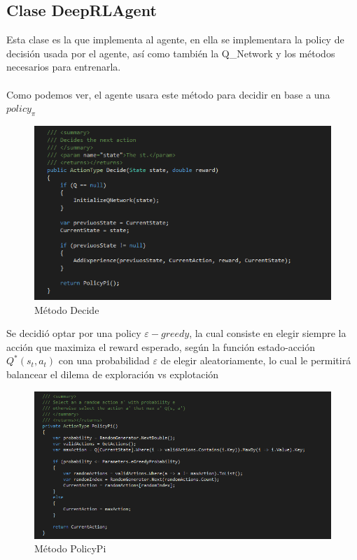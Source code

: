 \clearpage
\subsection{Clase DeepRLAgent}

Esta clase es la que implementa al agente, en ella se implementara la policy de decisión usada por el agente, así como también la Q\_Network y los métodos necesarios para entrenarla.
\\\\
Como podemos ver, el agente usara este método para decidir en base a una $policy_\pi$
\begin{figure}[h!]
	\centering
	\includegraphics[scale=0.6]{imagenes/screen6.png}
	\caption{Método Decide}
\end{figure}

Se decidió optar por una policy $\varepsilon-greedy$, la cual consiste en elegir siempre la acción que maximiza el reward esperado, según la función estado-acción $Q^*(s_t, a_t)$ con una probabilidad $\varepsilon$ de elegir aleatoriamente, lo cual le permitirá balancear el dilema de exploración vs explotación

\begin{figure}[h!]
	\centering
	\includegraphics[scale=0.5]{imagenes/screen7.png}
	\caption{Método PolicyPi}
\end{figure}


